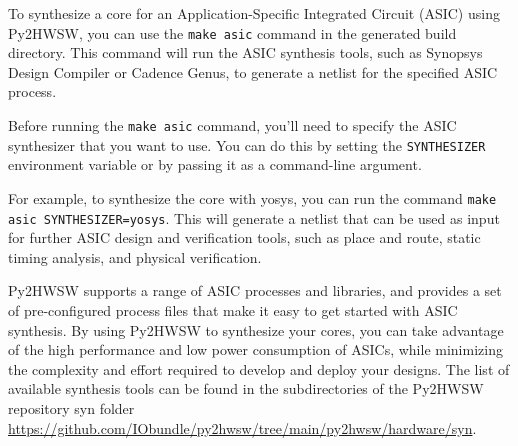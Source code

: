 %

To synthesize a core for an Application-Specific Integrated Circuit (ASIC) using Py2HWSW, you can use the \texttt{make asic} command in the generated build directory. This command will run the ASIC synthesis tools, such as Synopsys Design Compiler or Cadence Genus, to generate a netlist for the specified ASIC process.

Before running the \texttt{make asic} command, you'll need to specify the ASIC synthesizer that you want to use. You can do this by setting the \texttt{SYNTHESIZER} environment variable or by passing it as a command-line argument.

For example, to synthesize the core with yosys, you can run the command \texttt{make asic SYNTHESIZER=yosys}. This will generate a netlist that can be used as input for further ASIC design and verification tools, such as place and route, static timing analysis, and physical verification.

Py2HWSW supports a range of ASIC processes and libraries, and provides a set of pre-configured process files that make it easy to get started with ASIC synthesis. By using Py2HWSW to synthesize your cores, you can take advantage of the high performance and low power consumption of ASICs, while minimizing the complexity and effort required to develop and deploy your designs.
The list of available synthesis tools can be found in the subdirectories of the Py2HWSW repository syn folder \url{https://github.com/IObundle/py2hwsw/tree/main/py2hwsw/hardware/syn}.
